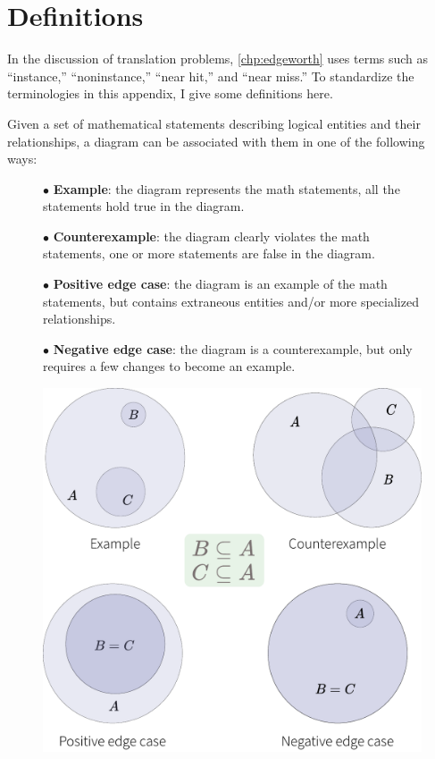 \section{Definitions}
\label{sec:definitions}

In the discussion of translation problems, \cref{chp:edgeworth} uses terms such as ``instance,'' ``noninstance,'' ``near hit,'' and ``near miss.'' To standardize the terminologies in this appendix, I give some definitions here.

Given a set of mathematical statements describing logical entities and their relationships, a diagram can be associated with them in one of the following ways:

\vspace{0.5em}
\begin{figure}[h]
\begin{minipage}[b]{0.48\linewidth}
$\bullet$ \textbf{Example}: the diagram represents the math statements, \ie all the statements hold true in the diagram. 
    \vspace{3pt}
    
$\bullet$ \textbf{Counterexample}: the diagram clearly violates the math statements, \ie one or more statements are false in the diagram.
    \vspace{3pt}
    
$\bullet$ \textbf{Positive edge case}: the diagram is an example of the math statements, but contains extraneous entities and/or more specialized relationships. 
    \vspace{3pt}
    
$\bullet$ \textbf{Negative edge case}: the diagram is a counterexample, but only requires a few changes to become an example.
\end{minipage}
\hfill
\begin{minipage}[b]{0.45\linewidth}
    \centering
    \includegraphics[width=\textwidth]{assets/appendix/definitions-examples.pdf}
\end{minipage}
\end{figure}

